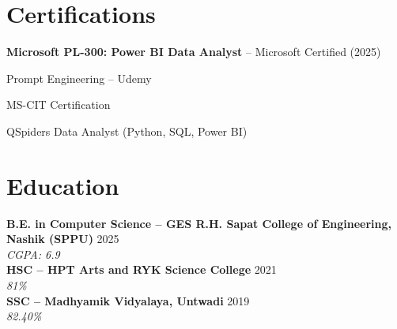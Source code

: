 \documentclass[letterpaper,10pt]{article}
\newenvironment{resume_list}{
  \vspace{-4pt}
  \begin{itemize}[leftmargin=18pt, itemsep=-3pt]
}{
  \end{itemize}
}
\begin{document}
\section*{Certifications}
\begin{resume_list}
  \item \textbf{Microsoft PL-300: Power BI Data Analyst} – Microsoft Certified (2025)
  \item Prompt Engineering – Udemy
  \item MS-CIT Certification
  \item QSpiders Data Analyst (Python, SQL, Power BI)
\end{resume_list}


\section*{Education}

\textbf{B.E. in Computer Science – GES R.H. Sapat College of Engineering, Nashik (SPPU)} \hfill 2025 \\
\textit{CGPA: 6.9} \\[-2pt]

\textbf{HSC – HPT Arts and RYK Science College} \hfill 2021 \\
\textit{81\%} \\[-2pt]

\textbf{SSC – Madhyamik Vidyalaya, Untwadi} \hfill 2019 \\
\textit{82.40\%}
\end{document}
